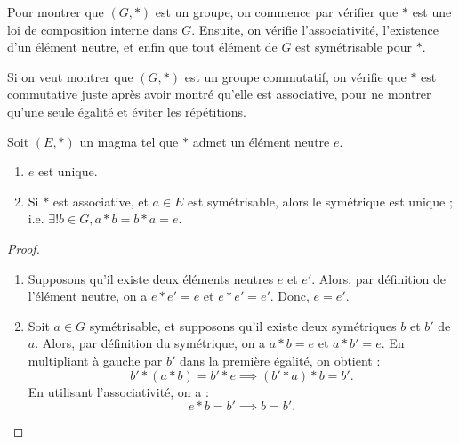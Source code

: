 \documentclass[12pt, a4paper]{report}
\begin{document}
\begin{methodbox}
    Pour montrer que $(G,*)$ est un groupe, on commence par vérifier que $*$ est une loi de composition interne dans $G$. Ensuite, on vérifie l'associativité, l'existence d'un élément neutre, et enfin que tout élément de $G$ est symétrisable pour $*$.

    Si on veut montrer que $(G,*)$ est un groupe commutatif, on vérifie que $*$ est commutative juste après avoir montré qu'elle est associative, pour ne montrer qu'une seule égalité et éviter les répétitions.
\end{methodbox}

\begin{property}
    Soit $(E,*)$ un magma tel que $*$ admet un élément neutre $e$.

    \begin{enumerate}
        \item $e$ est unique.
        \item Si $*$ est associative, et $a\in E$ est symétrisable, alors le symétrique est unique ; i.e. $\exists ! b \in G, a * b = b * a = e$.
    \end{enumerate}
\end{property}

\begin{proof}
    \begin{enumerate}
        \item Supposons qu'il existe deux éléments neutres $e$ et $e'$. Alors, par définition de l'élément neutre, on a $e*e' = e$ et $e*e' = e'$. Donc, $e = e'$.
        \item Soit $a\in G$ symétrisable, et supposons qu'il existe deux symétriques $b$ et $b'$ de $a$. Alors, par définition du symétrique, on a $a*b = e$ et $a*b' = e$. En multipliant à gauche par $b'$ dans la première égalité, on obtient :
        $$b'*(a*b) = b'*e \implies (b'*a)*b = b'.$$
        En utilisant l'associativité, on a :
        $$e*b = b' \implies b = b'.$$
    \end{enumerate}
\end{proof}
\end{document}
